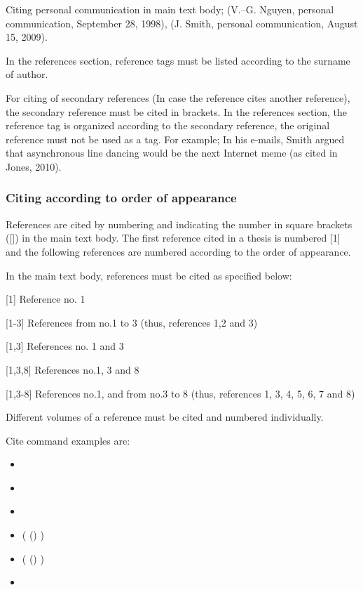 Citing personal communication in main text body; (V.–G. Nguyen, personal communication, September 28, 1998), (J. Smith, personal communication, August 15, 2009).

In the references section, reference tags must be listed according to the surname of author. 

For citing of secondary references (In case the reference cites another reference), the secondary reference must be cited in brackets.  In the references section, the reference tag is organized according to the secondary reference, the original reference must not be used as a tag. For example; In his e-mails, Smith argued that asynchronous line dancing would be the next Internet meme (as cited in Jones, 2010).

\subsubsection{Citing according to order of appearance}

References are cited by numbering and indicating the number in square brackets ([]) in the main text body. The first reference cited in a thesis is numbered [1] and the following references are numbered according to the order of appearance.

In the main text body, references must be cited as specified below:

[1]	Reference no. 1

[1-3]	References from no.1 to 3 (thus, references 1,2 and 3)

[1,3]	References no. 1 and 3

[1,3,8]	References no.1, 3 and 8

[1,3-8]	References no.1, and from no.3 to 8 (thus, references 1, 3, 4, 5, 6, 7 and 8)

Different volumes of a reference must be cited and numbered individually.

Cite command examples are:

\begin{itemize}
    \item \cite{sisaky}
    \item \parencite{sisaky}
    \item \textcite{sisaky}
    \item (\citeauthor{sisaky} (\citeyear{sisaky}) \parencite{sisaky})
    \item (\citeauthor{sisaky} (\citeyear{sisaky}) \parencite{sisaky})
    \item \textcite[\chaptername\ \ref{ch:ch4}]{sisaky} 
  \end{itemize}

